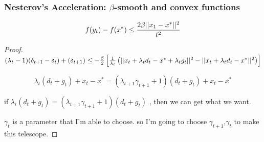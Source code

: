 \begin{frame}\frametitle{ Nesterov’s Acceleration: $\beta$-smooth and convex functions}
$$f(y_t)-f(x^*) \leq {2\beta ||x_1-x^*||^2 \over t^2}$$

\begin{proof}


$(\lambda_t - 1)(\delta_{t+1} - \delta_{t}) + (\delta_{t+1}) \leq -{\beta \over 2}\left[{1 \over \lambda_t}\left(||x_t+\lambda_t d_t-x^*+\lambda_t g_t||^2-||x_t+\lambda_t d_t - x^*||^2\right)\right]$

$$\lambda_t(d_t+g_t)+x_t-x^* = (\lambda_{t+1}\gamma_{t+1}+1)(d_t+g_t)+x_t-x^*$$



if $\lambda_t(d_t+g_t) = (\lambda_{t+1}\gamma_{t+1}+1)(d_t+g_t)$ , then we can get what we want.

$\gamma_t$ is a parameter that I'm able to choose. so I'm going to choose $\gamma_{t+1}$,$\gamma_t$ to make this telescope.


\end{proof}

\end{frame}











